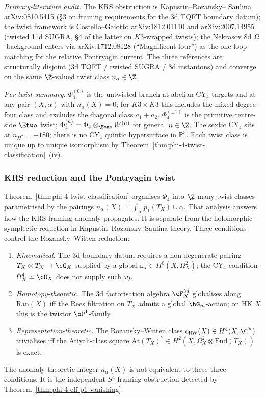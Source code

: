 \emph{Primary-literature audit.} The KRS obstruction is Kapustin--Rozansky--
Saulina arXiv:0810.5415 (§3 on framing requirements for the 3d TQFT
boundary datum); the twist framework is Costello--Gaiotto arXiv:1812.01110
and arXiv:2007.14955 (twisted 11d SUGRA, §4 of the latter on $K3$-wrapped
twists); the Nekrasov 8d $\Omega$-background enters via arXiv:1712.08128
(``Magnificent four'') as the one-loop matching for the relative
Pontryagin current. The three references are structurally disjoint
(3d TQFT / twisted SUGRA / 8d instantons) and converge on the same
\(\Z\)-valued twist class \(n_\alpha\in\Z\).

\emph{Per-twist summary.} $\Phi_4^{(0)}$ is the untwisted branch at
abelian CY${}_4$ targets and at any pair \((X,\alpha)\) with
\(n_\alpha(X)=0\); for \(K3\times K3\) this includes the mixed
degree-four class and excludes the diagonal class \(a_1+a_2\).
\(\Phi_4^{(\pm1)}\) is the primitive centre-side \(\Etwo\) twist;
\(\Phi_4^{(n)}=\Phi_4\otimes_{\Eone}W^{(n)}\)
for general \(n\in\Z\). The sextic CY$_4$ sits at \(n_{H^2}=-180\); there is
no CY$_4$ quintic hypersurface in \(\mathbb P^5\). Each twist class is unique up to unique isomorphism
by Theorem~\ref{thm:phi-4-twist-classification}~(iv).


\subsubsection{KRS reduction and the Pontryagin twist}
\label{subsubsec:krs-kapranov-dichotomy}

Theorem~\ref{thm:phi-4-twist-classification} organises $\Phi_4$ into
\(\Z\)-many twist classes parametrised by the pairings
\(n_\alpha(X)=\int_Xp_1(T_X)\cup\alpha\). That
analysis answers how the KRS framing anomaly propagates. It is separate from
the holomorphic-symplectic reduction in Kapustin--Rozansky--Saulina theory.
Three conditions control the Rozansky--Witten reduction:
\begin{enumerate}[label=\textup{(}\alph*\textup{)}]
 \item \emph{Kinematical.} The 3d boundary datum requires a
 non-degenerate pairing $T_X \otimes T_X \to \cO_X$ supplied by a
 global $\omega_I \in H^0(X, \Omega^2_X)$; the CY${}_4$ condition
 $\Omega^4_X \simeq \cO_X$ does not supply such $\omega_I$.
 \item \emph{Homotopy-theoretic.} The 3d factorisation algebra
 $\cF^{3d}_X$ globalises along $\mathrm{Ran}(X)$ iff the Rees
 filtration on $T_X$ admits a global $\bG_m$-action; on HK $X$ this is
 the twistor $\bP^1$-family.
 \item \emph{Representation-theoretic.} The Rozansky--Witten class
 $c_{\mathrm{RW}}(X) \in H^4(X, \C^\times)$ trivialises iff the
 Atiyah-class square $\mathrm{At}(T_X)^2 \in
 H^2(X, \Omega^2_X \otimes \mathrm{End}(T_X))$ is exact.
\end{enumerate}
The anomaly-theoretic integer \(n_\alpha(X)\) is not equivalent to these
three conditions. It is the independent \(S^4\)-framing obstruction detected
by Theorem~\ref{thm:phi-4-eff-p1-vanishing}.

